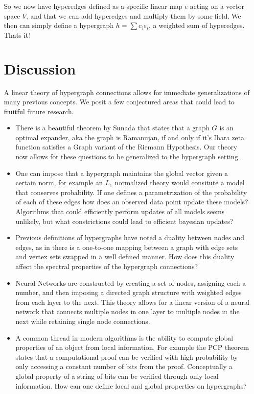 \documentclass{article}
\begin{document}
So we now have hyperedges defined as a specific linear map $e$ acting on a vector space $V$, and that we can add hyperedges and multiply them by some field. We then can simply define a hypergraph $h = \sum c_i e_i$, a weighted sum of hyperedges. Thats it! 


\section{Discussion}
A linear theory of hypergraph connections allows for immediate generalizations of many previous concepts. We posit a few conjectured areas that could lead to fruitful future research.
\begin{itemize}
    \item There is a beautiful theorem by Sunada that states that a graph $G$ is an optimal expander, aka the graph is Ramanujan, if and only if it's Ihara zeta function satisfies a Graph variant of the Riemann Hypothesis. Our theory now allows for these questions to be generalized to the hypergraph setting.
    \item One can impose that a hypergraph maintains the global vector given a certain norm, for example an $L_1$ normalized theory would consitute a model that conserves probability. If one defines a parametrization of the probability of each of these edges how does an observed data point update these models? Algorithms that could efficiently perform updates of all models seems unlikely, but what constrictions could lead to efficient bayesian updates?
    \item Previous definitions of hypergraphs have noted a duality between nodes and edges, as in there is a one-to-one mapping between a graph with edge sets and vertex sets swapped in a well defined manner. How does this duality affect the spectral properties of the hypergraph connections?
    \item Neural Networks are constructed by creating a set of nodes, assigning each a number, and then imposing a directed graph structure with weighted edges from each layer to the next. This theory allows for a linear version of a neural network that connects multiple nodes in one layer to multiple nodes in the next while retaining single node connections.
    \item A common thread in modern algorithms is the ability to compute global properties of an object from local information. For example the PCP theorem states that a computational proof can be verified with high probability by only accessing a constant number of bits from the proof. Conceptually a global property of a string of bits can be verified through only local information. How can one define local and global properties on hypergraphs?

\end{itemize}
\end{document}

